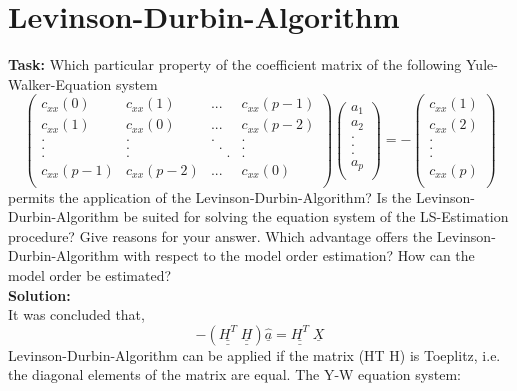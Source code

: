 \section{Levinson-Durbin-Algorithm}
\noindent \textbf{Task:} Which particular property of the coefficient matrix of the following Yule-Walker-Equation system
\begin{equation*}
\begin{pmatrix}
c_{xx}(0) & c_{xx}(1) & ... & c_{xx}(p-1)\\
c_{xx}(1) & c_{xx}(0) & ... & c_{xx}(p-2)\\
. & . &.  &. \\
. & . &\;\;.  &. \\
. & . &\; \; \; \; .  &. \\
c_{xx}(p-1) & c_{xx}(p-2) & ... & c_{xx}(0)\\
\end{pmatrix}
\begin{pmatrix}
a_1\\
a_2\\
. \\
. \\
. \\
a_p \\
\end{pmatrix} = -
\begin{pmatrix}
c_{xx}(1)\\
c_{xx}(2)\\
. \\
. \\
. \\
c_{xx}(p)\\
\end{pmatrix}
\end{equation*}
permits the application of the Levinson-Durbin-Algorithm? Is the Levinson-Durbin-Algorithm be suited for solving the equation system of the LS-Estimation procedure? Give reasons for your answer. Which advantage offers the Levinson-Durbin-Algorithm with respect to the model order estimation? How can the model order be estimated? \\
\noindent \textbf{Solution:}\\
\noindent It was concluded that,
$$ -(\underline{\underline{H^T}}\;\underline{\underline{H}})\underline{\hat{a}} = \underline{\underline{H^T}}\;\underline{X}      $$
\noindent Levinson-Durbin-Algorithm can be applied if the matrix (HT H) is Toeplitz, i.e. the diagonal elements of the matrix are equal.
\noindent The Y-W equation system:
